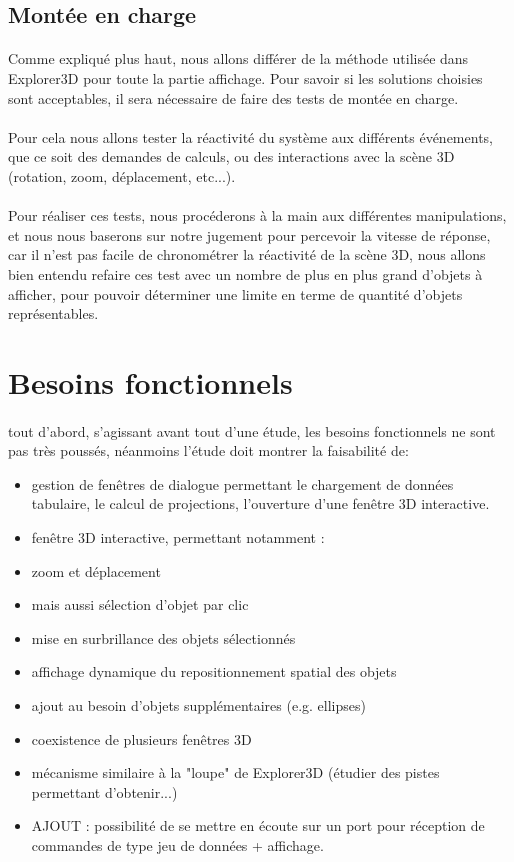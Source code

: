 \documentclass{article}
\begin{document}
\subsection{Montée en charge}
\paragraph{} Comme expliqué plus haut, nous allons différer de la méthode utilisée dans Explorer3D pour toute la partie affichage. Pour savoir si les solutions choisies sont acceptables, il sera nécessaire de faire des tests de montée en charge.\paragraph{} Pour cela nous allons tester la réactivité du système aux différents événements, que ce soit des demandes de calculs, ou des interactions avec la scène 3D (rotation, zoom, déplacement, etc...).\paragraph{} Pour réaliser ces tests, nous procéderons à la main aux différentes manipulations, et nous nous baserons sur notre jugement pour percevoir la vitesse de réponse, car il n'est pas facile de chronométrer la réactivité de la scène 3D, nous allons bien entendu refaire ces test avec un nombre de plus en plus grand d'objets à afficher, pour pouvoir déterminer une limite en terme de quantité d'objets représentables.
\newpage
\section{Besoins fonctionnels}
\paragraph{} 
tout d'abord, s'agissant avant tout d'une étude, les besoins fonctionnels ne sont pas très poussés, néanmoins l'étude doit montrer la faisabilité de:\begin{itemize}
\item gestion de fenêtres de dialogue permettant le chargement de données tabulaire, le calcul de projections, l'ouverture d'une fenêtre 3D interactive.
\item fenêtre 3D interactive, permettant notamment :
\item zoom et déplacement
\item mais aussi sélection d'objet par clic
\item mise en surbrillance des objets sélectionnés
\item affichage dynamique du repositionnement spatial des objets
\item ajout au besoin d'objets supplémentaires (e.g. ellipses)
\item coexistence de plusieurs fenêtres 3D
\item mécanisme similaire à la "loupe" de Explorer3D (étudier des pistes permettant d'obtenir...)
\item AJOUT : possibilité de se mettre en écoute sur un port pour réception de commandes de type jeu de données + affichage.
\end{itemize}
\newpage
\end{document}
